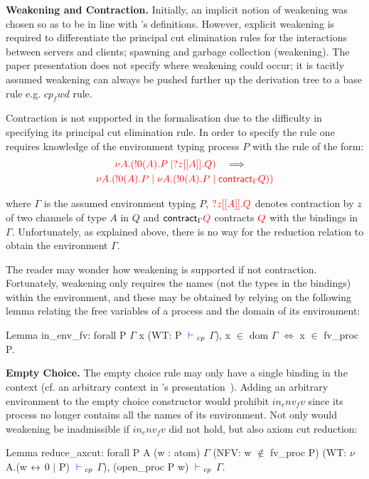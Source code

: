 \textbf{Weakening and Contraction.} Initially, an implicit notion of weakening
was chosen so as to be in line with \citeauthor{Wadler:2014}'s
definitions. However, explicit weakening is required to differentiate the
principal cut elimination rules for the interactions between servers and
clients; spawning and garbage collection (weakening). The paper presentation
does not specify where weakening could occur; it is tacitly assumed weakening
can always be pushed further up the derivation tree to a base rule
e.g. \coqe$cp_fwd$ rule.

\begin{samepage}
Contraction is not supported in the formalisation due to the difficulty in
specifying its principal cut elimination rule.  In order to specify the rule
one requires knowledge of the environment typing process \coqe$P$ with the
rule of the form:
\begin{gather*}
{\color{red}\nu A.(!0(A).P \mid ?z[[A]].Q)}
\quad \Longrightarrow \quad \\
{\color{red} \nu A.(!0(A).P \mid \nu A.(!0(A).P \mid \textsf{contract}_{\Gamma} Q))}
\end{gather*}

where $\Gamma$ is the assumed environment typing \coqe$P$, ${\color{red} ?z[[A]].Q}$
denotes contraction by $z$ of two channels of type $A$ in $Q$ and
$\textsf{contract}_{\Gamma} {\color{red} Q}$ contracts ${\color{red} Q}$ with the bindings in
$\Gamma$. Unfortunately, as explained above, there is no way for the reduction
relation to obtain the environment $\Gamma$.
\end{samepage}

The reader may wonder how weakening is supported if not
contraction. Fortunately, weakening only requires the names (not the types in
the bindings) within the environment, and these may be obtained by relying on
the following lemma relating the free variables of a process and the domain of
its environment:
\begin{coq}
Lemma in_env_fv:
  forall P $\Gamma$ x (WT: P ${\color{blue} {} \vdash {}}_{cp}$ $\Gamma$),
    x $\in$ dom $\Gamma$ $\iff$ x $\in$ fv_proc P.
\end{coq}

\textbf{Empty Choice.} The empty choice rule may only have a single binding in
the context (cf. an arbitrary context in \citeauthor{Wadler:2014}'s
presentation~\cite{Wadler:2014}). Adding an arbitrary environment to the empty
choice constructor would prohibit \coqe$in_env_fv$ since its process no longer
contains all the names of its environment. Not only would weakening be
inadmissible if \coqe$in_env_fv$ did not hold, but also axiom cut reduction:
\begin{coq}
Lemma reduce_axcut:
  forall P A (w : atom) $\Gamma$
         (NFV: w $\notin$ fv_proc P)
         (WT: $\nu$ A.(w ${\leftrightarrow}$ 0 $\mid$ P) ${\color{blue} {} \vdash {}}_{cp}$ $\Gamma$),
    (open_proc P w) ${\color{blue} {} \vdash {}}_{cp}$ $\Gamma$.
\end{coq}

